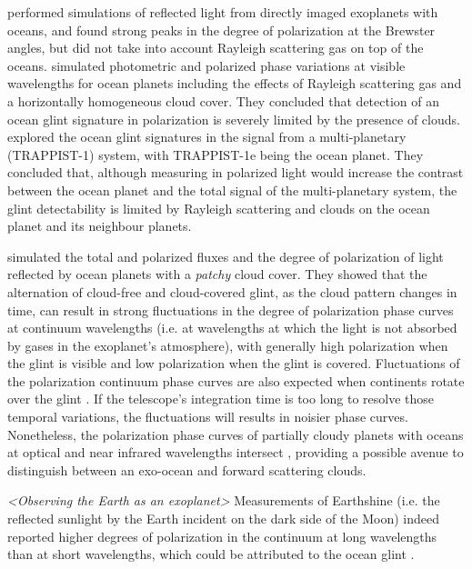 \documentclass[
    usenatbib,
]{mnras}
\begin{document}
\cite{2008Icar..195..927W} performed simulations of reflected light from directly imaged exoplanets with oceans, and found strong peaks in the degree of polarization at the Brewster angles, but did not take into account Rayleigh scattering gas on top of the oceans. \cite{Zugger_2010} simulated photometric and polarized phase variations at visible wavelengths for ocean planets including the effects of Rayleigh scattering gas and a horizontally homogeneous cloud cover. They concluded that detection of an ocean glint signature in polarization is severely limited by the presence of clouds. \citet{kopparla2018} explored the ocean glint signatures in the signal from a multi-planetary (TRAPPIST-1) system, with TRAPPIST-1e being the ocean planet. They concluded that, although measuring in polarized light would increase the contrast between the ocean planet and the total signal of the multi-planetary system, the glint detectability is limited by Rayleigh scattering and clouds on the ocean planet and its neighbour planets.

\citet{treesandstam2019} simulated the total and polarized fluxes and the degree of polarization of light reflected by ocean planets with a \textit{patchy} cloud cover. They showed that the alternation of cloud-free and cloud-covered glint, as the cloud pattern changes in time, can result in strong fluctuations in the degree of polarization phase curves at continuum wavelengths (i.e. at wavelengths at which the light is not absorbed by gases in the exoplanet's atmosphere), with generally high polarization 
when the glint is visible and low polarization when the glint is covered. Fluctuations of the polarization continuum phase curves are also expected when continents rotate over the glint \citep{groot2020}. If the telescope's integration time is too long to resolve those temporal variations, the fluctuations will results in noisier phase curves. Nonetheless, the polarization phase curves of partially cloudy planets with oceans at optical and near infrared wavelengths intersect \citep{treesandstam2019}, providing a possible avenue to distinguish between an exo-ocean and forward scattering clouds. 

\textit{<Observing the Earth as an exoplanet>}
Measurements of Earthshine (i.e. the reflected sunlight by the Earth incident on the dark side of the Moon) indeed reported higher degrees of polarization in the continuum at long wavelengths than at short wavelengths, which could be attributed to the ocean glint \citep{Emde2017,sterzik2019,takahashi2021}.
\end{document}
